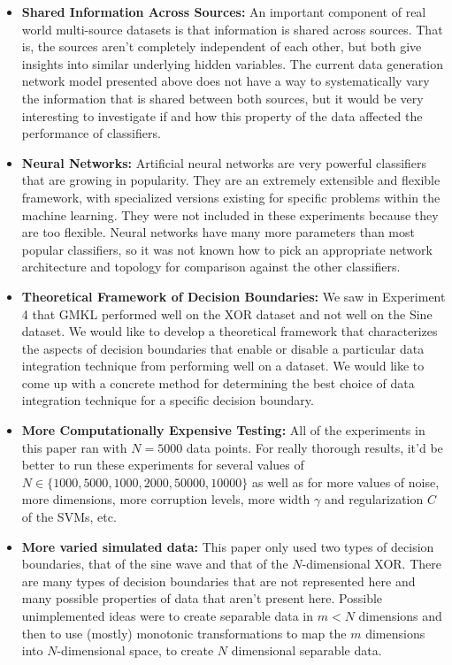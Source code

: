 \documentclass{article}
\begin{document}
\begin{itemize}
    \item \textbf{Shared Information Across Sources:} An important component of
        real world multi-source datasets is that information is shared across
        sources. That is, the sources aren't completely independent of each
        other, but both give insights into similar underlying hidden variables.
        The current data generation network model presented above does not have
        a way to systematically vary the information that is shared between
        both sources, but it would be very interesting to investigate if
        and how this property of the data affected the performance of
        classifiers.
    \item \textbf{Neural Networks:} Artificial neural networks are very powerful
        classifiers that are growing in popularity. They are an extremely
        extensible and flexible framework, with specialized versions existing
        for specific problems within the machine learning. They were not
        included in these experiments because they are too flexible. Neural
        networks have many more parameters than most popular classifiers, so it
        was not known how to pick an appropriate network architecture and
        topology for comparison against the other classifiers.
    \item \textbf{Theoretical Framework of Decision Boundaries:} We saw in
        Experiment 4 that GMKL performed well on the XOR dataset and not well
        on the Sine dataset. We would like to develop a theoretical framework
        that characterizes the aspects of decision boundaries that enable or
        disable a particular data integration technique from performing well on
        a dataset. We would like to come up with a concrete method for
        determining the best choice of data integration technique for a
        specific decision boundary.
    \item \textbf{More Computationally Expensive Testing:} All of the
        experiments in this paper ran with $N=5000$ data points. For really
        thorough results, it'd be better to run these experiments for several
        values of $N \in \{1000, 5000, 1000, 2000, 50000, 10000\}$ as well as
        for more values of noise, more dimensions, more corruption levels, more
        width $\gamma$ and regularization $C$ of the SVMs, etc.
    \item \textbf{More varied simulated data:} This paper only used two types
        of decision boundaries, that of the sine wave and that of the
        $N$-dimensional XOR. There are many types of decision boundaries that
        are not represented here and many possible properties of data that
        aren't present here. Possible unimplemented ideas were to create
        separable data in $m < N$ dimensions and then to use (mostly) monotonic
        transformations to map the $m$ dimensions into $N$-dimensional space,
        to create $N$ dimensional separable data.
\end{itemize}
\end{document}

